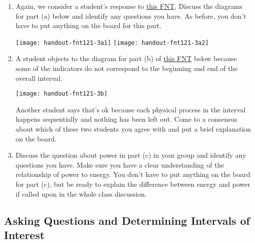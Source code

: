 \begin{fnt}
	
\end{fnt}


\begin{enumerate}[1.]

	\item Again, we consider a student's response to \hyperref[fnt1.2.1-3]{this FNT}. Discuss the diagrams for part (a) below and identify any questions you have. As before, you don't have to put anything on the board for this part.
	
		\texttt{[image: handout-fnt121-3a1]}
		\;
		\texttt{[image: handout-fnt121-3a2]}
	
	\item A student objects to the diagram for part (b) of \hyperref[fnt1.2.1-3]{this FNT} below because some of the indicators do not correspond to the beginning and end of the overall interval.
	
		\texttt{[image: handout-fnt121-3b]}
		
		Another student says that's ok because each physical process in the interval happens sequentially and nothing has been left out. Come to a consensus about which of these two students you agree with and put a brief explanation on the board.
	
	\item Discuss the question about power in part (c) in your group and identify any questions you have. Make sure you have a clear understanding of the relationship of power to energy. You don't have to put anything on the board for part (c), but be ready to explain the difference between energy and power if called upon in the whole class discussion.

\WCD

\end{enumerate}

\subsection{Asking Questions and Determining Intervals of Interest}
\label{act1.2.2D}

\begin{fnt}
	
\end{fnt}


